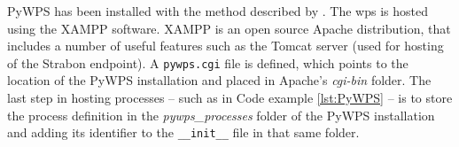 PyWPS has been installed with the method described by \cite{wps:Deltares}. The \ac{wps} is hosted using the XAMPP software. XAMPP is an open source Apache distribution, that includes a number of useful features such as the Tomcat server (used for hosting of the Strabon endpoint). A \texttt{pywps.cgi} file is defined, which points to the location of the PyWPS installation and placed in Apache's \textit{cgi-bin} folder. The last step in hosting processes -- such as in Code example \ref{lst:PyWPS} -- is to store the process definition in the \textit{pywps\_processes} folder of the PyWPS installation and adding its identifier to the \texttt{\_\_init\_\_} file in that same folder.    


